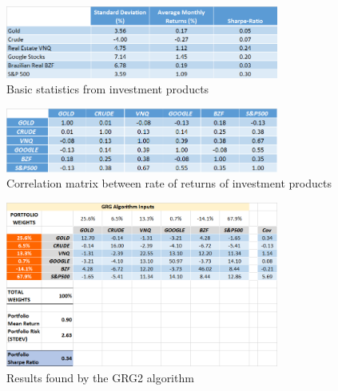 \documentclass[a4paper,man,natbib]{apa6}
\begin{document}
	
	
	
	\begin{figure}
	\centering
	\includegraphics[width=0.8\textwidth]{basic_stat.png}
	\caption{\label{fig:figure 1}Basic statistics from investment products}
	\end{figure}
	\begin{figure}
	\centering
	\includegraphics[width=0.8\textwidth]{correl_matrix.png}
	\caption{\label{fig:figure 2}Correlation matrix between rate of returns of investment products}
	\end{figure}
	\begin{figure}
	\centering
	\includegraphics[width=0.8\textwidth]{results.png}
	\caption{\label{fig:figure 3}Results found by the GRG2 algorithm}
	\end{figure}
	
\end{document}
